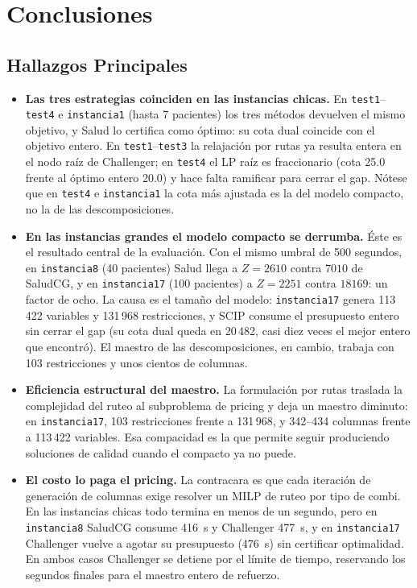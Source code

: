 \documentclass[12pt]{article}
\numberwithin{algorithm}{section}
\begin{document}
\newpage
\section{Conclusiones}
\label{sec:conclusiones}

\subsection{Hallazgos Principales}

\begin{itemize}
    \item \textbf{Las tres estrategias coinciden en las instancias chicas.} En \texttt{test1}--\texttt{test4} e \texttt{instancia1} (hasta 7 pacientes) los tres métodos devuelven el mismo objetivo, y Salud lo certifica como óptimo: su cota dual coincide con el objetivo entero. En \texttt{test1}--\texttt{test3} la relajación por rutas ya resulta entera en el nodo raíz de Challenger; en \texttt{test4} el LP raíz es fraccionario (cota 25.0 frente al óptimo entero 20.0) y hace falta ramificar para cerrar el gap. Nótese que en \texttt{test4} e \texttt{instancia1} la cota más ajustada es la del modelo compacto, no la de las descomposiciones.
    \item \textbf{En las instancias grandes el modelo compacto se derrumba.} Éste es el resultado central de la evaluación. Con el mismo umbral de 500 segundos, en \texttt{instancia8} (40 pacientes) Salud llega a $Z = 2610$ contra $7010$ de SaludCG, y en \texttt{instancia17} (100 pacientes) a $Z = 2251$ contra $18169$: un factor de ocho. La causa es el tamaño del modelo: \texttt{instancia17} genera 113\,422 variables y 131\,968 restricciones, y SCIP consume el presupuesto entero sin cerrar el gap (su cota dual queda en 20\,482, casi diez veces el mejor entero que encontró). El maestro de las descomposiciones, en cambio, trabaja con 103 restricciones y unos cientos de columnas.
    \item \textbf{Eficiencia estructural del maestro.} La formulación por rutas traslada la complejidad del ruteo al subproblema de pricing y deja un maestro diminuto: en \texttt{instancia17}, 103 restricciones frente a 131\,968, y 342--434 columnas frente a 113\,422 variables. Esa compacidad es la que permite seguir produciendo soluciones de calidad cuando el compacto ya no puede.
    \item \textbf{El costo lo paga el pricing.} La contracara es que cada iteración de generación de columnas exige resolver un MILP de ruteo por tipo de combi. En las instancias chicas todo termina en menos de un segundo, pero en \texttt{instancia8} SaludCG consume 416~s y Challenger 477~s, y en \texttt{instancia17} Challenger vuelve a agotar su presupuesto (476~s) sin certificar optimalidad. En ambos casos Challenger se detiene por el límite de tiempo, reservando los segundos finales para el maestro entero de refuerzo.

\end{itemize}
\end{document}
